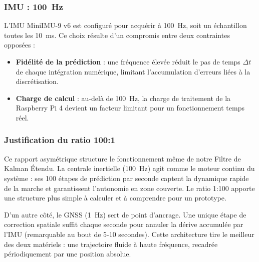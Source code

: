\subsubsection{IMU : 100~Hz}

L'IMU MiniIMU-9 v6 est configuré pour acquérir à 100~Hz, soit un
échantillon toutes les 10~ms. Ce choix résulte d'un compromis entre deux
contraintes opposées :

\begin{itemize}
    \item \textbf{Fidélité de la prédiction} : une fréquence élevée réduit
    le pas de temps $\Delta t$ de chaque intégration numérique, limitant
    l'accumulation d'erreurs liées à la discrétisation.
    \item \textbf{Charge de calcul} : au-delà de 100~Hz, la charge de
    traitement de la Raspberry Pi 4 devient un facteur limitant pour un
    fonctionnement temps réel.
\end{itemize}

\subsubsection{Justification du ratio 100:1}

Ce rapport asymétrique structure le fonctionnement même de notre Filtre de Kalman Étendu. La centrale inertielle (100~Hz) agit comme le moteur continu du système : ses 100 étapes de prédiction par seconde captent la dynamique rapide de la marche et garantissent l'autonomie en zone couverte. Le ratio 1:100 apporte une structure plus simple à calculer et à comprendre pour un prototype.

D'un autre côté, le GNSS (1~Hz) sert de point d'ancrage. Une unique étape de correction spatiale suffit chaque seconde pour annuler la dérive accumulée par l'IMU (remarquable au bout de 5-10 secondes). Cette architecture tire le meilleur des deux matériels : une trajectoire fluide à haute fréquence, recadrée périodiquement par une position absolue.